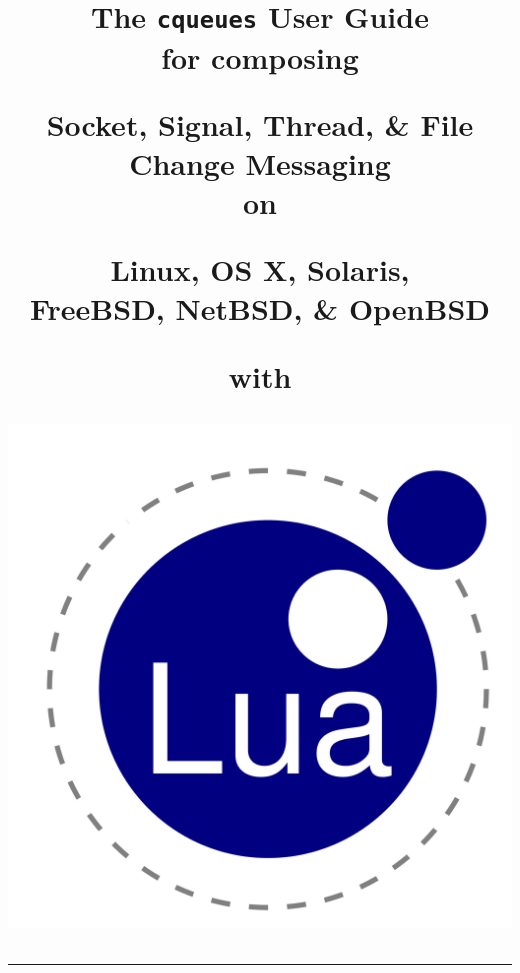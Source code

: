 \documentclass[11pt, oneside]{memoir}
\newcommand*{\cqueues}[0]{\texttt{cqueues}\xspace}
\begin{document}

\title{
\HUGE\sffamily The \cqueues User Guide \\


\vspace*{10pt}
\LARGE for composing \\
\vspace*{10pt}

\HUGE Socket, Signal, Thread, \& File Change Messaging \\


\vspace*{10pt}
\LARGE on \\
\vspace*{10pt}

\HUGE Linux, OS X, Solaris, \\ FreeBSD, NetBSD, \& OpenBSD

\vspace*{10pt}
\LARGE with \\
\vspace*{10pt}

{\includegraphics[scale=0.10]{art/lua.pdf}}

\vspace*{30pt}
\hrule
}
\end{document}
